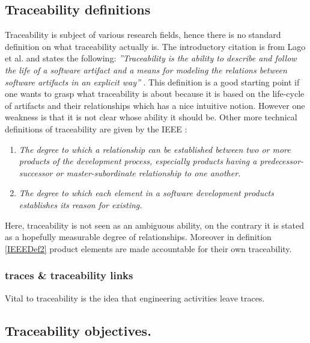 \subsection{Traceability definitions}
Traceability is subject of various research fields, hence there is no standard definition on what traceability actually is. The introductory citation is from Lago et al. \cite{ScopedTraceability} and states the following: \textit{''Traceability is the ability to describe and follow the life of a software artifact and a means for modeling the relations between software artifacts in an explicit way''} . This definition is a good starting point if one wants to grasp what traceability is about because it is based on the life-cycle of artifacts and their relationships which has a nice intuitive notion. However one weakness is that it is not clear whose ability it should be. Other more technical definitions of traceability are given by the IEEE \cite{IEEEGlossary}:
\begin{enumerate}
\item 
\label{IEEEDef1}
\textit{The degree to which a relationship can be established between two or more products of the development process, especially products having a predecessor-successor or master-subordinate relationship to one another.}
\item 
\label{IEEEDef2}
\textit{The degree to which each element in a software development products establishes its reason for existing.}
\end{enumerate}
Here, traceability is not seen as an ambiguous ability, on the contrary it is stated as a hopefully measurable degree of relationships. Moreover in definition \ref{IEEEDef2} product elements are made accountable for their own traceability.

\subsubsection{traces \& traceability links}
Vital to traceability is the idea that engineering activities leave traces.

\subsection{Traceability objectives.}



